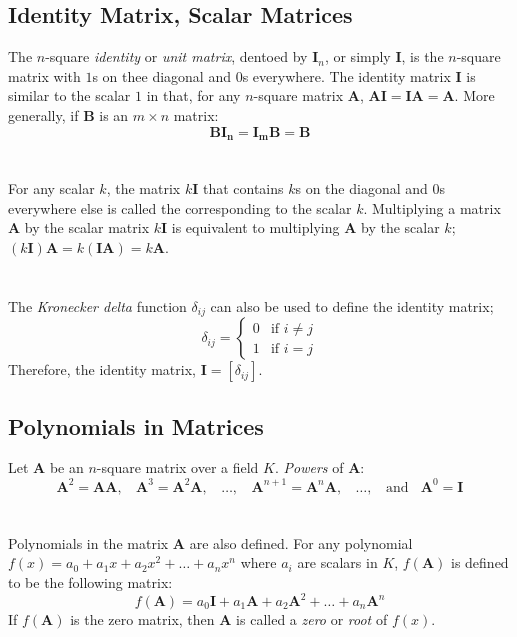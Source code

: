 \documentclass[../setup.tex]{subfiles}
\begin{document}
\subsection{Identity Matrix, Scalar Matrices}
The $n$-square \textit{identity} or \textit{unit matrix}, dentoed by $\bm{I}_n$, or simply $\bm{I}$, is the $n$-square matrix with $1$s on thee diagonal and $0$s everywhere. The identity matrix $\bm{I}$ is similar to the scalar $1$ in that, for any $n$-square matrix $\bm{A}$, $\bm{AI} = \bm{IA} = \bm{A}$. More generally, if $\bm{B}$ is an $m \times n$ matrix:
\[\bm{BI_n} = \bm{I_mB} = \bm{B}\]
\phantom \\ \\
For any scalar $k$, the matrix $k\bm{I}$ that contains $k$s on the diagonal and $0$s everywhere else is called the  corresponding to the scalar $k$. Multiplying a matrix $\bm{A}$ by the scalar matrix $k\bm{I}$ is equivalent to multiplying $\bm{A}$ by the scalar $k$; $(k\bm{I})\bm{A} = k(\bm{IA}) = k\bm{A}$. \\
\phantom \\ \\
The \textit{Kronecker delta} function $\delta_{ij}$ can also be used to define the identity matrix;
\[\delta_{ij} = 
\begin{cases}
0 & \text{if } i \neq j \\
1 & \text{if } i = j
\end{cases}\]
Therefore, the identity matrix, $\bm{I} = [\delta_{ij}]$.


\subsection{Polynomials in Matrices}
Let $\bm{A}$ be an $n$-square matrix over a field $K$. \textit{Powers} of $\bm{A}$:
\[\bm{A}^2 = \bm{A}\bm{A}, \ \ \ \ \bm{A}^3 = \bm{A}^2\bm{A}, \ \ \ \ \dots, \ \ \ \ \bm{A}^{n+1} = \bm{A}^n\bm{A},
\ \ \ \ \dots, \ \ \ \ \text{and} \ \ \ \ \bm{A}^0 = \bm{I}\]
\phantom \\ \\
Polynomials in the matrix $\bm{A}$ are also defined. For any polynomial $f(x) = a_0 + a_1x + a_2x^2 + \dots + a_nx^n$ where $a_i$ are scalars in $K$, $f(\bm{A})$ is defined to be the following matrix:
\[f(\bm{A}) = a_0\bm{I} + a_1\bm{A} + a_2\bm{A}^2 + \dots + a_n\bm{A}^n\]
If $f(\bm{A})$ is the zero matrix, then $\bm{A}$ is called a \textit{zero} or \textit{root} of $f(x)$. \\
\pagebreak
\end{document}
